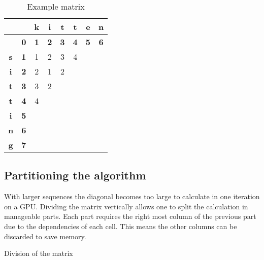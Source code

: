 {\newcommand\C[0]{\cellcolor{gray}}
\begin{table}
\centering \large
\begin{tabular}{|c|c||c|c|c|c|c|c|} \hline
           &            & \textbf{k} & \textbf{i} & \textbf{t} & \textbf{t} & \textbf{e} & \textbf{n} \\ \hline
           & \textbf{0} & \textbf{1} & \textbf{2} & \textbf{3} & \textbf{4} & \textbf{5} & \textbf{6} \\ \hline \hline
\textbf{s} & \textbf{1} & 1          & 2          & 3          & 4          & \C         &            \\ \hline
\textbf{i} & \textbf{2} & 2          & 1          & 2          & \C         &            &            \\ \hline
\textbf{t} & \textbf{3} & 3          & 2          & \C         &            &            &            \\ \hline
\textbf{t} & \textbf{4} & 4          & \C         &            &            &            &            \\ \hline
\textbf{i} & \textbf{5} & \C         &            &            &            &            &            \\ \hline
\textbf{n} & \textbf{6} &            &            &            &            &            &            \\ \hline
\textbf{g} & \textbf{7} &            &            &            &            &            &            \\ \hline
\end{tabular}
\caption{Example matrix} \label{diagonal}
\end{table}
}

\subsection{Partitioning the algorithm} \label{partitioning}
With larger sequences the diagonal becomes too large to calculate in one iteration on a GPU.
Dividing the matrix vertically allows one to split the calculation in manageable parts.
Each part requires the right most column of the previous part due to the dependencies of each cell.
This means the other columns can be discarded to save memory.

\begin{table}
    \centering
    
    \caption{Division of the matrix} \label{division}
\end{table}

